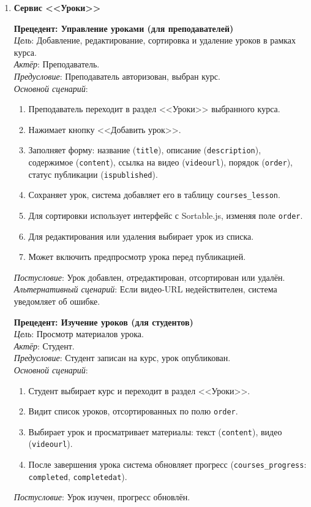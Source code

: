 \begin{enumerate}
	\item \textbf{Сервис <<Уроки>>}
	
	\textbf{Прецедент: Управление уроками (для преподавателей)} \\
	\textit{Цель}: Добавление, редактирование, сортировка и удаление уроков в рамках курса. \\
	\textit{Актёр}: Преподаватель. \\
	\textit{Предусловие}: Преподаватель авторизован, выбран курс. \\
	\textit{Основной сценарий}:
	\begin{enumerate}
		\item Преподаватель переходит в раздел <<Уроки>> выбранного курса.
		\item Нажимает кнопку <<Добавить урок>>.
		\item Заполняет форму: название (\texttt{title}), описание (\texttt{description}), содержимое (\texttt{content}), ссылка на видео (\texttt{videourl}), порядок (\texttt{order}), статус публикации (\texttt{ispublished}).
		\item Сохраняет урок, система добавляет его в таблицу \texttt{courses\_lesson}.
		\item Для сортировки использует интерфейс с Sortable.js, изменяя поле \texttt{order}.
		\item Для редактирования или удаления выбирает урок из списка.
		\item Может включить предпросмотр урока перед публикацией.
	\end{enumerate}
	\textit{Постусловие}: Урок добавлен, отредактирован, отсортирован или удалён. \\
	\textit{Альтернативный сценарий}: Если видео-URL недействителен, система уведомляет об ошибке.
	
	\textbf{Прецедент: Изучение уроков (для студентов)} \\
	\textit{Цель}: Просмотр материалов урока. \\
	\textit{Актёр}: Студент. \\
	\textit{Предусловие}: Студент записан на курс, урок опубликован. \\
	\textit{Основной сценарий}:
	\begin{enumerate}
		\item Студент выбирает курс и переходит в раздел <<Уроки>>.
		\item Видит список уроков, отсортированных по полю \texttt{order}.
		\item Выбирает урок и просматривает материалы: текст (\texttt{content}), видео (\texttt{videourl}).
		\item После завершения урока система обновляет прогресс (\texttt{courses\_progress}: \texttt{completed}, \texttt{completedat}).
	\end{enumerate}
	\textit{Постусловие}: Урок изучен, прогресс обновлён.
	

\end{enumerate}
